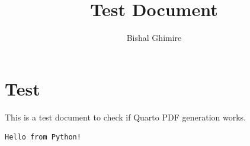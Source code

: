 \documentclass[
  11pt,
  oneside,
  openany]{scrbook}
\title{Test Document}
\author{Bishal Ghimire}
\date{}
\begin{document}
\frontmatter
\maketitle



\mainmatter
\chapter{Test}\label{test}

This is a test document to check if Quarto PDF generation works.

\begin{verbatim}
Hello from Python!
\end{verbatim}


\backmatter
\end{document}
